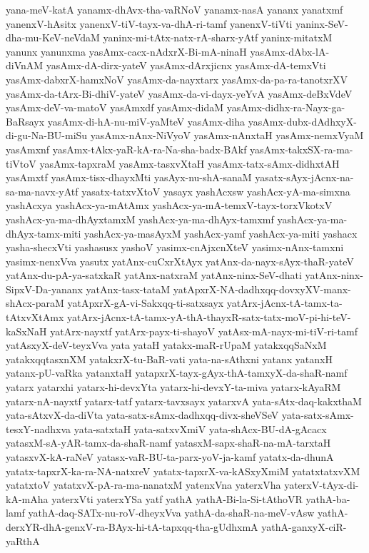 {yana-meV-katA
yanamx-dhAvx-tha-vaRNoV
yanamx-nasA
yananx
yanatxmf
yanenxV-hAsitx
yanenxV-tiV-tayx-va-dhA-ri-tamf
yanenxV-tiVti
yaninx-SeV-dha-mu-KeV-neVdaM
yaninx-mi-tAtx-natx-rA-sharx-yAtf
yaninx-mitatxM
yanunx
yanunxma
yasAmx-cacx-nAdxrX-Bi-mA-ninaH
yasAmx-dAbx-lA-diVnAM
yasAmx-dA-dirx-yateV
yasAmx-dArxjicnx
yasAmx-dA-temxVti
yasAmx-dabxrX-hamxNoV
yasAmx-da-nayxtarx
yasAmx-da-pa-ra-tanotxrXV
yasAmx-da-tArx-Bi-dhiV-yateV
yasAmx-da-vi-dayx-yeYvA
yasAmx-deBxVdeV
yasAmx-deV-va-matoV
yasAmxdf
yasAmx-didaM
yasAmx-didhx-ra-Nayx-ga-BaRsayx
yasAmx-di-hA-nu-miV-yaMteV
yasAmx-diha
yasAmx-dubx-dAdhxyX-di-gu-Na-BU-miSu
yasAmx-nAnx-NiVyoV
yasAmx-nAnxtaH
yasAmx-nemxVyaM
yasAmxnf
yasAmx-tAkx-yaR-kA-ra-Na-sha-badx-BAkf
yasAmx-takxSX-ra-ma-tiVtoV
yasAmx-tapxraM
yasAmx-tasxvXtaH
yasAmx-tatx-sAmx-didhxtAH
yasAmxtf
yasAmx-tisx-dhayxMti
yasAyx-nu-shA-sanaM
yasatx-sAyx-jAcnx-na-sa-ma-navx-yAtf
yasatx-tatxvXtoV
yasayx
yashAcxsw
yashAcx-yA-ma-simxna
yashAcxya
yashAcx-ya-mAtAmx
yashAcx-ya-mA-temxV-tayx-torxVkotxV
yashAcx-ya-ma-dhAyxtamxM
yashAcx-ya-ma-dhAyx-tamxmf
yashAcx-ya-ma-dhAyx-tamx-miti
yashAcx-ya-masAyxM
yashAcx-yamf
yashAcx-ya-miti
yashacx
yasha-shecxVti
yashasusx
yashoV
yasimx-cnAjxcnXteV
yasimx-nAnx-tamxni
yasimx-nenxVva
yasutx
yatAnx-cuCxrXtAyx
yatAnx-da-nayx-sAyx-thaR-yateV
yatAnx-du-pA-ya-satxkaR
yatAnx-natxraM
yatAnx-ninx-SeV-dhati
yatAnx-ninx-SipxV-Da-yananx
yatAnx-tasx-tataM
yatApxrX-NA-dadhxqq-dovxyXV-manx-shAcx-paraM
yatApxrX-gA-vi-Sakxqq-ti-satxsayx
yatArx-jAcnx-tA-tamx-ta-tAtxvXtAmx
yatArx-jAcnx-tA-tamx-yA-thA-thayxR-satx-tatx-moV-pi-hi-teV-kaSxNaH
yatArx-nayxtf
yatArx-payx-ti-shayoV
yatAsx-mA-nayx-mi-tiV-ri-tamf
yatAsxyX-deV-teyxVva
yata
yataH
yatakx-maR-rUpaM
yatakxqqSaNxM
yatakxqqtasxnXM
yatakxrX-tu-BaR-vati
yata-na-sAthxni
yatanx
yatanxH
yatanx-pU-vaRka
yatanxtaH
yatapxrX-tayx-gAyx-thA-tamxyX-da-shaR-namf
yatarx
yatarxhi
yatarx-hi-devxYta
yatarx-hi-devxY-ta-miva
yatarx-kAyaRM
yatarx-nA-nayxtf
yatarx-tatf
yatarx-tavxsayx
yatarxvA
yata-sAtx-daq-kakxthaM
yata-sAtxvX-da-diVta
yata-satx-sAmx-dadhxqq-divx-sheVSeV
yata-satx-sAmx-tesxY-nadhxva
yata-satxtaH
yata-satxvXmiV
yata-shAcx-BU-dA-gAcacx
yatasxM-sA-yAR-tamx-da-shaR-namf
yatasxM-sapx-shaR-na-mA-tarxtaH
yatasxvX-kA-raNeV
yatasx-vaR-BU-ta-parx-yoV-ja-kamf
yatatx-da-dhunA
yatatx-tapxrX-ka-ra-NA-natxreV
yatatx-tapxrX-va-kASxyXmiM
yatatxtatxvXM
yatatxtoV
yatatxvX-pA-ra-ma-nanatxM
yatenxVna
yaterxVha
yaterxV-tAyx-di-kA-mAha
yaterxVti
yaterxYSa
yatf
yathA
yathA-Bi-la-Si-tAthoVR
yathA-ba-lamf
yathA-daq-SATx-nu-roV-dheyxVva
yathA-da-shaR-na-meV-vAsw
yathA-derxYR-dhA-genxV-ra-BAyx-hi-tA-tapxqq-tha-gUdhxmA
yathA-ganxyX-ciR-yaRthA
}
